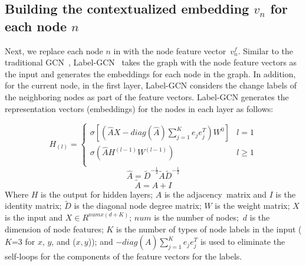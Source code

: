 
\subsection{Building the contextualized embedding $v_n$ for each node $n$}
\label{label-gcn-compute}



Next, we replace each node $n$ in {\mvpdgxy} with the node feature
vector~$v^{f}_n$.
Similar to the traditional GCN~\cite{gcn}, Label-GCN~\cite{label-gcn}
takes the graph with the node feature vectors as the input and
generates the embeddings for each node in the graph. In addition, for
the current node, in the first layer, Label-GCN considers the change
labels of the neighboring nodes as part of the feature vectors.
Label-GCN generates the representation vectors (embeddings) for the nodes in each
layer as follows:

\begin{equation}\label{new-eq1}
	H_{(l)} = 
	\begin{cases}
		\sigma [(\hat{A}X-diag(\hat{A})\sum_{j=1}^{K}e_je^T_j)W^0] &  l = 1\\
		\sigma (\hat{A}H^{(l-1)}W^{(l-1)}) &  l \geq 1\\
	\end{cases}
\end{equation}
\begin{equation}\label{new-eq2}
	\hat{A} = \tilde{D}^{-\frac{1}{2}}\tilde{A}\tilde{D}^{-\frac{1}{2}}
\end{equation}
\begin{equation}\label{new-eq3}
	\tilde{A} = A + I
\end{equation}
Where $H$ is the output for hidden layers; $A$ is the
adjacency~matrix and $I$ is the identity matrix; $\tilde{D}$ is the diagonal node degree matrix; $W$
is the weight matrix; $X$ is the input and $X \in R^{numx(d+K)}$;
$num$ is the number of nodes;~$d$ is the dimension of node features;
$K$ is the number of types of node labels in the input ($K$=3 for $x$,
$y$, and ($x,y$)); and $-diag(\hat{A})\sum_{j=1}^{K}e_je^T_j$ is used
to eliminate the self-loops for the components of the feature vectors
for the labels.



